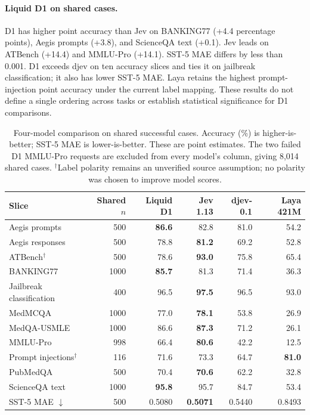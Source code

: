 \paragraph{Liquid D1 on shared cases.}
D1 has higher point accuracy than Jev on BANKING77 (+4.4 percentage points),
Aegis prompts (+3.8), and ScienceQA text (+0.1). Jev leads on ATBench
(+14.4) and MMLU-Pro (+14.1). SST-5 MAE differs by less than 0.001.
D1 exceeds djev on ten accuracy slices and ties it on jailbreak classification;
it also has lower SST-5 MAE. Laya retains the highest prompt-injection point
accuracy under the current label mapping. These results do not define a single
ordering across tasks or establish statistical significance for D1 comparisons.

\begin{table}[t]
\centering
\caption{Four-model comparison on shared successful cases. Accuracy (\%) is
higher-is-better; SST-5 MAE is lower-is-better. These are point estimates.
The two failed D1 MMLU-Pro requests are excluded from every model's column,
giving 8{,}014 shared cases. $^{\dagger}$Label polarity remains an unverified
source assumption; no polarity was chosen to improve model scores.}
\label{tab:d1}
\small
\begin{tabular}{@{}lrrrrr@{}}
\toprule
Slice & Shared $n$ & Liquid D1 & Jev 1.13 & djev-0.1 & Laya 421M \\
\midrule
Aegis prompts & 500 & \textbf{86.6} & 82.8 & 81.0 & 54.2 \\
Aegis responses & 500 & 78.8 & \textbf{81.2} & 69.2 & 52.8 \\
ATBench$^{\dagger}$ & 500 & 78.6 & \textbf{93.0} & 75.8 & 65.4 \\
BANKING77 & 1000 & \textbf{85.7} & 81.3 & 71.4 & 36.3 \\
Jailbreak classification & 400 & 96.5 & \textbf{97.5} & 96.5 & 93.0 \\
MedMCQA & 1000 & 77.0 & \textbf{78.1} & 53.8 & 26.9 \\
MedQA-USMLE & 1000 & 86.6 & \textbf{87.3} & 71.2 & 26.1 \\
MMLU-Pro & 998 & 66.4 & \textbf{80.6} & 42.2 & 12.5 \\
Prompt injections$^{\dagger}$ & 116 & 71.6 & 73.3 & 64.7 & \textbf{81.0} \\
PubMedQA & 500 & 70.4 & \textbf{70.6} & 62.2 & 32.8 \\
ScienceQA text & 1000 & \textbf{95.8} & 95.7 & 84.7 & 53.4 \\
\midrule
SST-5 MAE $\downarrow$ & 500 & 0.5080 & \textbf{0.5071} & 0.5440 & 0.8493 \\
\bottomrule
\end{tabular}
\end{table}
